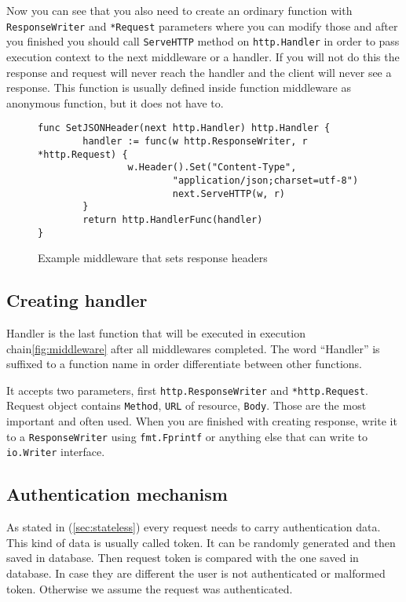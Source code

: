 Now you can see that you also need to create an ordinary function with\\ \verb|ResponseWriter| and \verb|*Request| parameters where you can modify those and after you finished you should call \verb|ServeHTTP| method on \verb|http.Handler| in order to pass execution context to the next middleware or a handler. If you will not do this the response and request will never reach the handler and the client will never see a response. This function is usually defined inside function middleware as anonymous function, but it does not have to.

\begin{figure}[!htbp]
\begin{verbatim}
func SetJSONHeader(next http.Handler) http.Handler {
        handler := func(w http.ResponseWriter, r *http.Request) {
                w.Header().Set("Content-Type",
                        "application/json;charset=utf-8")
                        next.ServeHTTP(w, r)
        }
        return http.HandlerFunc(handler)
}
\end{verbatim}
\renewcommand\figurename{Code}
\caption{Example middleware that sets response headers}
\label{src:example-middleware}
\end{figure}

\subsection{Creating handler}
Handler is the last function that will be executed in execution chain\ref{fig:middleware} after all middlewares completed. The word ``Handler'' is suffixed to a function name in order differentiate between other functions.

It accepts two parameters, first \verb|http.ResponseWriter| and \verb|*http.Request|. Request object contains \verb|Method|, \verb|URL| of resource, \verb|Body|. Those are the most important and often used. When you are finished with creating response, write it to a \verb|ResponseWriter| using \verb|fmt.Fprintf| or anything else that can write to \verb|io.Writer| interface.

\subsection{Authentication mechanism}
As stated in (\ref{sec:stateless}) every request needs to carry authentication data. This kind of data is usually called token. It can be randomly generated and then saved in database. Then request token is compared with the one saved in database. In case they are different the user is not authenticated or malformed token. Otherwise we assume the request was authenticated.

